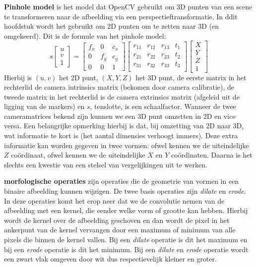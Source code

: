 \textbf{Pinhole model} is het model dat OpenCV gebruikt om 3D punten van een scene te transformeren naar de afbeelding via een perspectieftransformatie. In ddit hoofdstuk wordt het gebruikt om 2D punten om te zetten naar 3D (en omgekeerd). Dit is de formule van het pinhole model:
$$
s
\begin{bmatrix}
	u \\ 
	v \\
	1
\end{bmatrix} 
=
\begin{bmatrix}
	f_x & 0 & c_x \\ 
	0 & f_y & c_y \\
	0 & 0 & 1
\end{bmatrix} 
\begin{bmatrix}
	r_{11} & r_{12} & r_{13} & t_1 \\ 
	r_{21} & r_{22} & r_{23} & t_2 \\
	r_{31} & r_{32} & r_{33} & t_3 \\
\end{bmatrix}
\begin{bmatrix}
	X \\ 
	Y \\
	Z \\
	1
\end{bmatrix}
$$
Hierbij is $(u,v)$ het 2D punt, $(X,Y,Z)$ het 3D punt, de eerste matrix in het rechterlid de camera intrinsics matrix (bekomen door camera calibratie), de tweede matrix in het rechterlid is de camera extrinsics matrix (afgeleid uit de ligging van de markers) en $s$, tenslotte, is een schaalfactor. Wanneer de twee cameramatrices bekend zijn kunnen we een 3D punt omzetten in 2D en vice versa. Een belangrijke opmerking hierbij is dat, bij omzetting van 2D naar 3D, wat informatie te kort is (het aantal dimensies verhoogt immers). Deze extra informatie kan worden gegeven in twee vormen: ofwel kennen we de uiteindelijke $Z$ co\"ordinaat, ofwel kennen we de uiteindelijke $X$ en $Y$ co\"ordinaten. Daarna is het slechts een kwestie van een stelsel van vergelijkingen uit te werken.

\textbf{morfologische operaties} zijn operaties die de geometrie van vormen in een binaire afbeelding kunnen wijzigen. De twee basis operaties zijn \textit{dilate} en \textit{erode}. In deze operaties komt het erop neer dat we de convolutie nemen van de afbeelding met een kernel, die eender welke vorm of grootte kan hebben. Hierbij wordt de kernel over de afbeelding geschoven en dan wordt de pixel in het ankerpunt van de kernel vervangen door een maximum of minimum van alle pixels die binnen de kernel vallen. Bij een \textit{dilate} operatie is dit het maximum en bij een \textit{erode} operatie is dit het minimum. Bij een \textit{dilate} en \textit{erode} operatie wordt een zwart vlak omgeven door wit dus respectievelijk kleiner en groter. 

